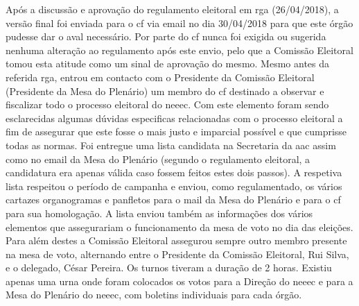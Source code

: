 Após a discussão e aprovação do regulamento eleitoral em \acrshort{rga} (26/04/2018), a versão final foi enviada para o \acrfull{cf} via email no dia 30/04/2018 para que este órgão pudesse dar o aval necessário. Por parte do \acrshort{cf} nunca foi exigida ou sugerida nenhuma alteração ao regulamento após este envio, pelo que a Comissão Eleitoral tomou esta atitude como um sinal de aprovação do mesmo. Mesmo antes da referida \acrshort{rga}, entrou em contacto com o Presidente da Comissão Eleitoral (Presidente da Mesa do Plenário) um membro do \acrshort{cf} destinado a observar e fiscalizar todo o processo eleitoral do \acrshort{neeec}. Com este elemento foram sendo esclarecidas algumas dúvidas especificas relacionadas com o processo eleitoral a fim de assegurar que este fosse o mais justo e imparcial possível e que cumprisse todas as normas. Foi entregue uma lista candidata na Secretaria da \acrshort{aac} assim como no email da Mesa do Plenário (segundo o regulamento eleitoral, a candidatura era apenas válida caso fossem feitos estes dois passos). A respetiva lista respeitou o período de campanha e enviou, como regulamentado, os vários cartazes organogramas e panfletos para o mail da Mesa do Plenário e para o \acrshort{cf} para sua homologação. A lista enviou também as informações dos vários elementos que assegurariam o funcionamento da mesa de voto no dia das eleições. Para além destes a Comissão Eleitoral assegurou sempre outro membro presente na mesa de voto, alternando entre o Presidente da Comissão Eleitoral, Rui Silva, e o delegado, César Pereira. Os turnos tiveram a duração de 2 horas. Existiu apenas uma urna onde foram colocados os votos para a Direção do \acrshort{neeec} e para a Mesa do Plenário do \acrshort{neeec}, com boletins individuais para cada órgão.

